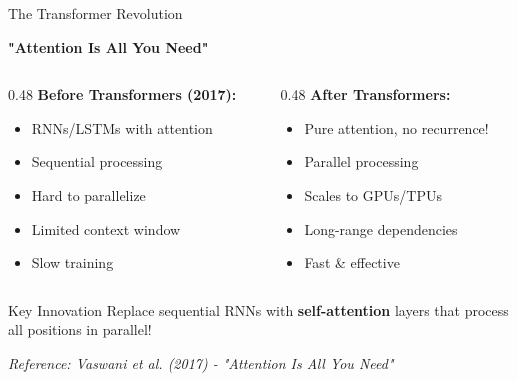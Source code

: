 \documentclass[aspectratio=169]{beamer}
\begin{document}
\begin{frame}[shrink=10]{The Transformer Revolution 🤖}
\begin{center}
\LARGE
\textbf{"Attention Is All You Need"}
\end{center}

\vspace{1em}

\begin{columns}[T]
\begin{column}{0.48\textwidth}
\textbf{Before Transformers (2017):}
\begin{itemize}\setlength{\itemsep}{0pt}
    \item RNNs/LSTMs with attention
    \item Sequential processing
    \item Hard to parallelize
    \item Limited context window
    \item Slow training
\end{itemize}
\end{column}

\pause

\begin{column}{0.48\textwidth}
\textbf{After Transformers:}
\begin{itemize}\setlength{\itemsep}{0pt}
    \item \alert{Pure attention, no recurrence!}
    \item Parallel processing
    \item Scales to GPUs/TPUs
    \item Long-range dependencies
    \item Fast \& effective
\end{itemize}
\end{column}
\end{columns}

\vspace{1em}

\begin{block}{Key Innovation}
Replace sequential RNNs with \textbf{self-attention} layers that process all positions in parallel!
\end{block}

\vspace{0.5em}
\small
\textit{Reference: Vaswani et al. (2017) - "Attention Is All You Need"}
\end{frame}
\end{document}
